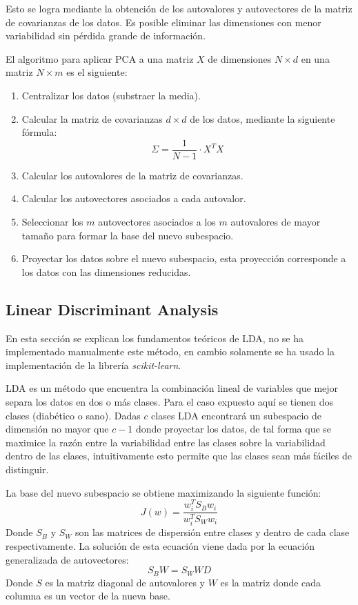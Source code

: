 \documentclass[letter, titlepage, 10pt]{article}
\begin{document}
Esto se logra mediante la obtención de los autovalores y autovectores de la matriz de covarianzas de los datos. Es posible eliminar las dimensiones con menor variabilidad sin pérdida grande de información.

El algoritmo para aplicar PCA a una matriz $X$ de dimensiones $N \times d$ en una matriz $N \times m$ es el siguiente:
\begin{enumerate}
\item Centralizar los datos (substraer la media).
\item Calcular la matriz de covarianzas $d \times d$ de los datos, mediante la siguiente fórmula:
    \begin{displaymath}
        \Sigma = \frac{1}{N - 1}\cdot X^T X
    \end{displaymath}
\item Calcular los autovalores de la matriz de covarianzas.
\item Calcular los autovectores asociados a cada autovalor.
\item Seleccionar los $m$ autovectores asociados a los $m$ autovalores de mayor tamaño para formar la base del nuevo subespacio.
\item Proyectar los datos sobre el nuevo subespacio, esta proyección corresponde a los datos con las dimensiones reducidas.
\end{enumerate}


\subsection{Linear Discriminant Analysis}
En esta sección se explican los fundamentos teóricos de LDA, no se ha implementado manualmente este método, en cambio solamente se ha usado la implementación de la librería \textit{scikit-learn}. 

LDA es un método que encuentra la combinación lineal de variables que mejor separa los datos en dos o más clases. Para el caso expuesto aquí se tienen dos clases (diabético o sano). Dadas $c$ clases LDA encontrará un subespacio de dimensión no mayor que $c-1$ donde proyectar los datos, de tal forma que se maximice la razón entre la variabilidad entre las clases sobre la variabilidad dentro de las clases, intuitivamente esto permite que las clases sean más fáciles de distinguir.

La base del nuevo subespacio se obtiene maximizando la siguiente función:
\begin{displaymath}
    J(w) = \frac{w_i^T S_B w_i}{w_i^T S_W w_i}
\end{displaymath}
Donde $S_B$ y $S_W$ son las matrices de dispersión entre clases y dentro de cada clase respectivamente. La solución de esta ecuación viene dada por la ecuación generalizada de autovectores:
\begin{displaymath}
    S_B W = S_W W D 
\end{displaymath}
Donde $S$ es la matriz diagonal de autovalores y $W$ es la matriz donde cada columna es un vector de la nueva base.
\end{document}
